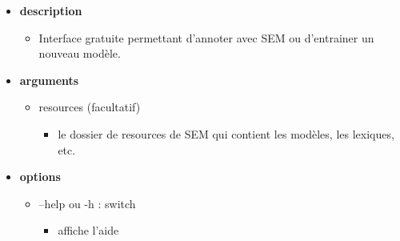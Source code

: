\documentclass[manual-fr.tex]{subfiles}
\begin{document}
\begin{itemize}
    \item[] \textbf{description}
        \begin{itemize}
            \item[] Interface gratuite permettant d'annoter avec SEM ou d'entrainer un nouveau modèle.
        \end{itemize}
    \item[] \textbf{arguments}
        \begin{itemize}
            \item[] resources (facultatif)
                \begin{itemize}
                    \item[] le dossier de resources de SEM qui contient les modèles, les lexiques, etc.
                \end{itemize}
        \end{itemize}
    \item[] \textbf{options}
        \begin{itemize}
            \item[] --help ou -h : switch
                \begin{itemize}
                    \item[] affiche l'aide
                \end{itemize}
        \end{itemize}
\end{itemize}
\end{document}

